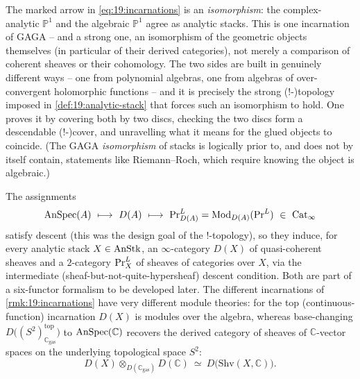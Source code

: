 \begin{remark}
\label{rmk:19:gaga}
The marked arrow in \eqref{eq:19:incarnations} is an \emph{isomorphism}: the
complex-analytic $\mathbb P^1$ and the algebraic $\mathbb P^1$ agree as analytic
stacks. This is one incarnation of GAGA -- and a strong one, an isomorphism of
the geometric objects themselves (in particular of their derived categories), not
merely a comparison of coherent sheaves or their cohomology. The two sides are
built in genuinely different ways -- one from polynomial algebras, one from
algebras of over-convergent holomorphic functions -- and it is precisely the
strong ($!$-)topology imposed in \cref{def:19:analytic-stack} that forces such an
isomorphism to hold. One proves it by covering both by two discs, checking the
two discs form a descendable ($!$-)cover, and unravelling what it means for the
glued objects to coincide. (The GAGA \emph{isomorphism} of stacks is logically
prior to, and does not by itself contain, statements like Riemann--Roch, which
require knowing the object is algebraic.)
\end{remark}

\begin{remark}
\label{rmk:19:D-sheaf}
The assignments
\begin{equation*}
\AnSpec(A)\ \longmapsto\ D(A)\ \longmapsto\ \PrL_{D(A)}=\Mod_{D(A)}(\PrL)\ \in\ \Catinf
\end{equation*}
satisfy descent (this was the design goal of the $!$-topology), so they induce,
for every analytic stack $X\in\operatorname{AnStk}$, an $\infty$-category $D(X)$ of
quasi-coherent sheaves and a $2$-category $\mathrm{Pr}^{L}_X$ of sheaves of categories over
$X$, via the intermediate (sheaf-but-not-quite-hypersheaf) descent condition.
Both are part of a six-functor formalism to be developed later. The different
incarnations of \cref{rmk:19:incarnations} have very different module theories:
for the top (continuous-function) incarnation $D(X)$ is modules over the algebra,
whereas base-changing $D\bigl((S^2)^{\mathrm{top}}_{\mathbb C_{\mathrm{gas}}}\bigr)$
to $\operatorname{AnSpec}(\mathbb C)$ recovers the derived category of sheaves of $\mathbb
C$-vector spaces on the underlying topological space $S^2$:
\begin{equation*}
D(X)\otimes_{D(\mathbb C_{\mathrm{gas}})}D(\mathbb C)\ \simeq\ D\bigl(\mathrm{Shv}(X,\mathbb C)\bigr).
\end{equation*}
\end{remark}

